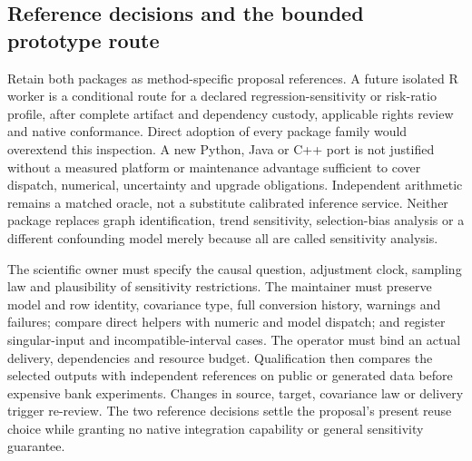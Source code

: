 \subsection{Reference decisions and the bounded prototype route}
\label{exec23:sensitivity-reuse-decision}
Retain both packages as method-specific proposal references. A future isolated
R worker is a conditional route for a declared regression-sensitivity or
risk-ratio profile, after complete artifact and dependency custody, applicable
rights review and native conformance. Direct adoption of every package family
would overextend this inspection. A new Python, Java or C++ port is not
justified without a measured platform or maintenance advantage sufficient to
cover dispatch, numerical, uncertainty and upgrade obligations. Independent
arithmetic remains a matched oracle, not a substitute calibrated inference
service. Neither package replaces graph identification, trend sensitivity,
selection-bias analysis or a different confounding model merely because all
are called sensitivity analysis.
\citep{exec23_sensitivity_sensemakr,exec23_sensitivity_evalue,exec23_sensitivity_reference}

The scientific owner must specify the causal question, adjustment clock,
sampling law and plausibility of sensitivity restrictions. The maintainer
must preserve model and row identity, covariance type, full conversion
history, warnings and failures; compare direct helpers with numeric and model
dispatch; and register singular-input and incompatible-interval cases. The
operator must bind an actual delivery, dependencies and resource budget.
Qualification then compares the selected outputs with independent references
on public or generated data before expensive bank experiments. Changes in
source, target, covariance law or delivery trigger re-review. The two reference
decisions settle the proposal's present reuse choice while granting no native
integration capability or general sensitivity guarantee.
